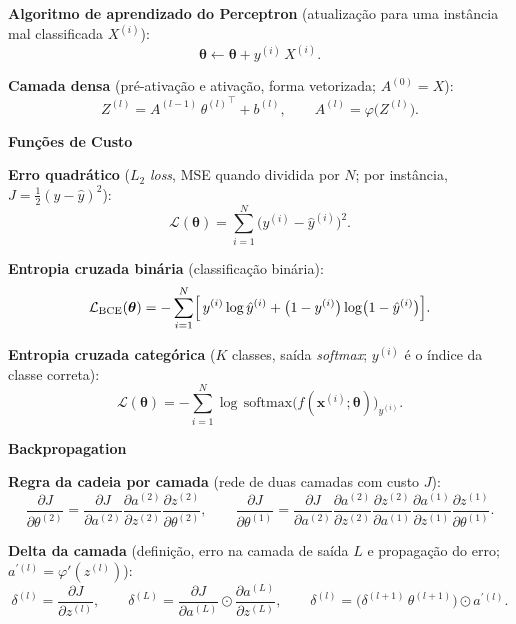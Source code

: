 \documentclass[11pt,a4paper]{article}
\newcommand{\thetav}{\boldsymbol{\theta}}
\newcommand{\bloco}[1]{%
  \par\vspace{0.3em}%
  {\bfseries\large #1}\par%
  \vspace{-0.4em}{\color{gray!60}\rule{\linewidth}{0.4pt}}\par%
}
\begin{document}
\textbf{Algoritmo de aprendizado do Perceptron} (atualização para uma instância mal classificada $X^{(i)}$):
\[
  \thetav \leftarrow \thetav + y^{(i)}\,X^{(i)}.
\]

\textbf{Camada densa} (pré-ativação e ativação, forma vetorizada; $A^{(0)} = X$):
\[
  Z^{(l)} = A^{(l-1)}\,{\theta^{(l)}}^{\top} + b^{(l)}, \qquad A^{(l)} = \varphi\bigl(Z^{(l)}\bigr).
\]

\bloco{Funções de Custo}

\textbf{Erro quadrático} ($L_2$ \textit{loss}, MSE quando dividida por $N$; por instância, $J = \tfrac{1}{2}(y - \hat{y})^{2}$):
\[
  \mathcal{L}(\thetav) = \sum_{i=1}^{N} \bigl(y^{(i)} - \hat{y}^{(i)}\bigr)^{2}.
\]

\textbf{Entropia cruzada binária} (classificação binária):
\[
  \mathcal{L}_{\text{BCE}}(\thetav) = -\sum_{i=1}^{N} \Bigl[\, y^{(i)} \log \hat{y}^{(i)} + \bigl(1 - y^{(i)}\bigr) \log\bigl(1 - \hat{y}^{(i)}\bigr) \Bigr].
\]

\textbf{Entropia cruzada categórica} ($K$ classes, saída \textit{softmax}; $y^{(i)}$ é o índice da classe correta):
\[
  \mathcal{L}(\thetav) = -\sum_{i=1}^{N} \log\,\mathrm{softmax}\bigl(f(\mathbf{x}^{(i)};\thetav)\bigr)_{y^{(i)}}.
\]

\bloco{Backpropagation}

\textbf{Regra da cadeia por camada} (rede de duas camadas com custo $J$):
\[
  \frac{\partial J}{\partial\theta^{(2)}}
    = \frac{\partial J}{\partial a^{(2)}}
      \frac{\partial a^{(2)}}{\partial z^{(2)}}
      \frac{\partial z^{(2)}}{\partial\theta^{(2)}},
  \qquad
  \frac{\partial J}{\partial\theta^{(1)}}
    = \frac{\partial J}{\partial a^{(2)}}
      \frac{\partial a^{(2)}}{\partial z^{(2)}}
      \frac{\partial z^{(2)}}{\partial a^{(1)}}
      \frac{\partial a^{(1)}}{\partial z^{(1)}}
      \frac{\partial z^{(1)}}{\partial\theta^{(1)}}.
\]

\textbf{Delta da camada} (definição, erro na camada de saída $L$ e propagação do erro; $a^{\prime(l)} = \varphi'(z^{(l)})$):
\[
  \delta^{(l)} = \frac{\partial J}{\partial z^{(l)}},
  \qquad
  \delta^{(L)} = \frac{\partial J}{\partial a^{(L)}} \odot \frac{\partial a^{(L)}}{\partial z^{(L)}},
  \qquad
  \delta^{(l)} = \bigl(\delta^{(l+1)}\,\theta^{(l+1)}\bigr) \odot a^{\prime(l)}.
\]
\end{document}
